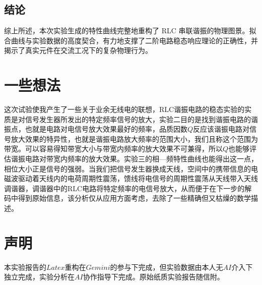 \documentclass[11pt, a4paper]{article}
\begin{document}
	\subsection{结论}
		综上所述，本次实验生成的特性曲线完整地重构了 RLC 串联谐振的物理图景。拟合曲线与实验数据的高度契合，有力地支撑了二阶电路稳态响应理论的正确性，并揭示了真实元件在交流工况下的复杂物理行为。
	\section{一些想法}
	这次试验使我产生了一些关于业余无线电的联想，RLC谐振电路的稳态实验的实质是对信号发生器所发出的特定频率信号的放大，实验二目的是找到谐振电路的谐振点，也就是电路对电信号放大效果最好的频率，品质因数$Q$反应该谐振电路对信号放大效果的特异性，也就是谐振电路放大频率的范围大小，我们且称这个范围为带宽。可以容易得知带宽大小与带宽内频率的放大效果不可兼得，所以$Q$也能够评估谐振电路对带宽内频率的放大效果。实验三的相—频特性曲线也能得出这一点，相位大小正是信号的强弱。当我们把信号发生器换成天线，空间中的携带信息的电磁波驱动着天线内的电荷周期性震荡，馈线将电信号的周期性震荡从天线带入天线调谐器，调谐器中的RLC电路将特定频率的电信号放大，从而便于在下一步的解码中得到原始信息，该分析仅从应用方面考虑，去除了一些精确但又枯燥的数学描述。

	\section{声明}
		本实验报告的$Latex$重构在$Gemini$的参与下完成，但实验数据由本人无$AI$介入下独立完成，实验分析在$AI$协作指导下完成。原始纸质实验报告随信附。
\end{document}
